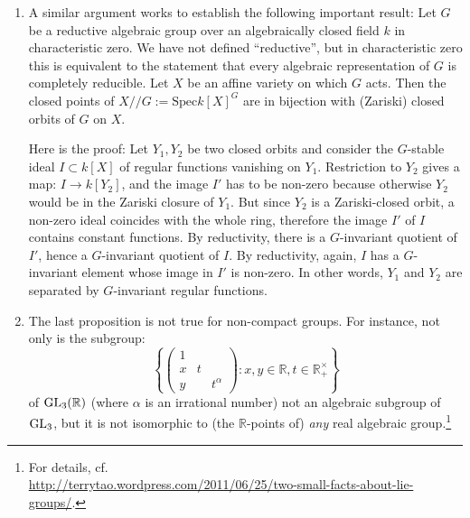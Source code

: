 \begin{remarks}
\begin{enumerate}
 \item A similar argument works to establish the following important result: Let $G$ be a reductive algebraic group over an algebraically closed field $k$ in characteristic zero. We have not defined ``reductive'', but in characteristic zero this is equivalent to the statement that every algebraic representation of $G$ is completely reducible. Let $X$ be an affine variety on which $G$ acts. Then the closed points of $X// G:=\text{Spec} k[X]^G$ are in bijection with (Zariski) closed orbits of $G$ on $X$.

Here is the proof: Let $Y_1, Y_2$ be two closed orbits and consider the $G$-stable ideal $I\subset k[X]$ of regular functions vanishing on $Y_1$. Restriction to $Y_2$ gives a map: $I\to k[Y_2]$, and the image $I'$ has to be non-zero because otherwise $Y_2$ would be in the Zariski closure of $Y_1$. But since $Y_2$ is a Zariski-closed orbit, a non-zero ideal coincides with the whole ring, therefore the image $I'$ of $I$ contains constant functions. By reductivity, there is a $G$-invariant quotient of $I'$, hence a $G$-invariant quotient of $I$. By reductivity, again, $I$ has a $G$-invariant element whose image in $I'$ is non-zero. In other words, $Y_1$ and $Y_2$ are separated by $G$-invariant regular functions.

\item The last proposition is not true for non-compact groups. For instance, not only is the subgroup:
$$\left\{\left(\begin{array}{ccc} 1 \\ x & t \\ y && t^\alpha \end{array}\right): x,y\in \mathbb R, t\in \mathbb R_+^\times \right\}$$
of ${\rm GL}_3(\mathbb R)$ (where $\alpha$ is an irrational number) not an algebraic subgroup of ${\rm GL}_3$, but it is not isomorphic to (the $\mathbb R$-points of) \emph{any} real algebraic group.\footnote{For details, cf.\ \\ \url{http://terrytao.wordpress.com/2011/06/25/two-small-facts-about-lie-groups/}.}

\end{enumerate}

 \end{remarks}
















